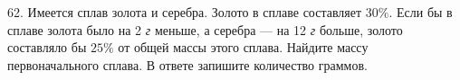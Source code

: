 62. Имеется сплав золота и серебра. Золото в сплаве составляет $30\%.$ Если бы в сплаве золота было на 2 {\it г} меньше, а серебра --- на 12 {\it г} больше, золото составляло бы $25\%$ от общей массы этого сплава. Найдите массу первоначального сплава. В ответе запишите количество граммов.\\
